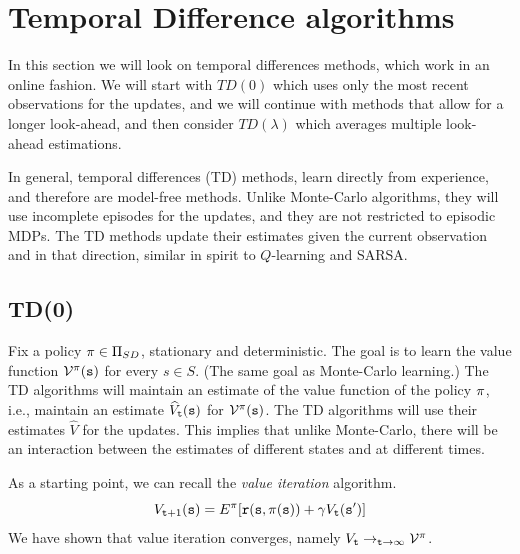 \section{Temporal Difference algorithms}
\label{sec:TD}

In this section we will look on temporal differences methods, which
work in an online fashion. We will start with $TD(0)$ which uses
only the most recent observations for the updates, and we will
continue with methods that allow for a longer look-ahead, and then
consider $TD(\lambda)$ which averages multiple look-ahead
estimations.

In general, temporal differences (TD) methods, learn directly from
experience, and therefore are model-free methods. Unlike Monte-Carlo
algorithms, they will use incomplete episodes for the updates, and
they are not restricted to episodic MDPs. The TD methods update
their estimates given the current observation and in that direction,
similar in spirit to $Q$-learning and SARSA.

\subsection{TD(0)}

Fix a policy $\pi\in \Pi_{SD}$, stationary and deterministic. The goal
is to learn the value function $\mathcal{V}^\pi({\tt s})$ for every
$s\in S$. (The same goal as Monte-Carlo learning.) The TD algorithms
will maintain an estimate of the value function of the policy
$\pi$, i.e., maintain an estimate $\widehat{V}_{\tt t}({\tt s})$
for $\mathcal{V}^\pi({\tt s})$. The TD algorithms will use their
estimates $\widehat{V}$ for the updates. This implies that unlike
Monte-Carlo, there will be an interaction between the estimates of
different states and at different times.

As a starting point, we can recall the {\em value iteration}
algorithm.
\[
V_{{\tt t}+1}({\tt s})=E^\pi[{\tt r}({\tt s},\pi({\tt s}))+\gamma
V_{\tt t}({\tt s}')]
\]
We have shown that value iteration converges, namely $V_{\tt t}
\rightarrow_{{\tt t}\rightarrow\infty} \mathcal{V}^\pi$.

